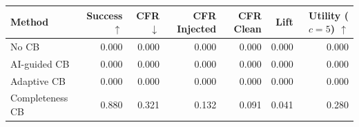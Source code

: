 \begin{tabular}{lrrrrrr}
\toprule
Method & Success $\uparrow$ & CFR $\downarrow$ & CFR Injected & CFR Clean & Lift & Utility ($c=5$) $\uparrow$ \\
\midrule
No CB & 0.000 & 0.000 & 0.000 & 0.000 & 0.000 & 0.000 \\
AI-guided CB & 0.000 & 0.000 & 0.000 & 0.000 & 0.000 & 0.000 \\
Adaptive CB & 0.000 & 0.000 & 0.000 & 0.000 & 0.000 & 0.000 \\
Completeness CB & 0.880 & 0.321 & 0.132 & 0.091 & 0.041 & 0.280 \\
\bottomrule
\end{tabular}

